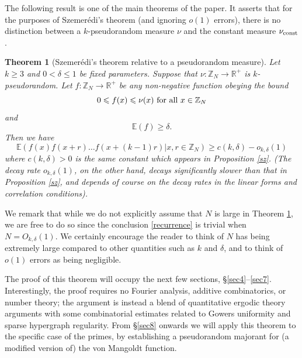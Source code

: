 \documentclass[12pt,a4paper,reqno]{amsart}
\numberwithin{equation}{section}
\theoremstyle{plain}
\newtheorem{theorem}[subsection]{Theorem}
\theoremstyle{definition}
\renewcommand{\leq}{\leqslant}
\renewcommand{\geq}{\geqslant}
\def\vconst{\ensuremath \nu_{\mbox{\scriptsize const}}}
\def\E{{\mathbb E}}
\def\R{{\mathbb R}}
\def\vs{\vspace{11pt}}
\def\ni{\noindent}
\begin{document}
\ni The following result is one of the main theorems of the paper.  It asserts that for the purposes of Szemer\'edi's theorem (and ignoring $o(1)$ errors), there is no distinction
between a $k$-pseudorandom measure $\nu$ and the constant measure $\vconst$.

\begin{theorem}[Szemer\'edi's theorem relative to a pseudorandom measure]\label{main}
Let $k \geq 3$ and $0 < \delta \leq 1$  be fixed parameters. Suppose that $\nu: \mathbb{Z}_N \to \R^+$ is $k$-pseudorandom. Let $f: \mathbb{Z}_N \to \R^+$ be any non-negative function obeying the bound
\begin{equation}\label{f-bound-2}
0 \leq f(x) \leq \nu(x) \hbox{ for all } x \in \mathbb{Z}_N
\end{equation}
and
\begin{equation}\label{f-density}
 \E(f) \geq \delta.
\end{equation}
Then we have
\begin{equation}\label{recurrence}
 \E( f(x) f(x+r) \ldots f(x+(k-1)r) | x,r \in \mathbb{Z}_N ) \geq c(k,\delta) - o_{k,\delta}(1)
\end{equation}
where $c(k,\delta) > 0$ is the same constant which appears in Proposition \ref{sz}.  \textup{(}The decay rate $o_{k,\delta}(1)$, on the other hand, decays significantly slower than that in Proposition \ref{sz}, and depends of course on the decay rates in the linear forms and correlation conditions\textup{)}.
\end{theorem}

\ni We remark that while we do not explicitly assume that $N$ is large in Theorem \ref{main}, we are free to do so since the conclusion
\eqref{recurrence} is trivial when $N = O_{k,\delta}(1)$.  We certainly encourage the reader to think of $N$ has being extremely large compared
to other quantities such as $k$ and $\delta$, and to think of $o(1)$ errors as being negligible.\vs

\ni The proof of this theorem will occupy the next few sections, \S\ref{sec4}--\ref{sec7}.  Interestingly, the proof requires no Fourier analysis, additive combinatorics, or number theory; the argument is instead a blend of quantitative ergodic theory arguments with some combinatorial estimates related to Gowers uniformity and sparse hypergraph regularity.  From \S \ref{sec8} onwards we will apply this theorem to
the specific case of the primes, by establishing a pseudorandom majorant for
(a modified version of) the von Mangoldt function.  
\end{document}
